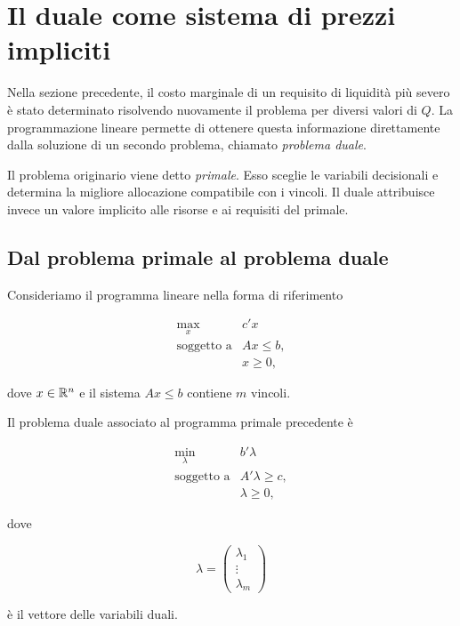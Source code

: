 \section{Il duale come sistema di prezzi impliciti}

\label{sec:cap11-duale}

Nella sezione precedente, il costo marginale di un requisito di liquidit\`{a}
pi\`{u} severo \`{e} stato determinato risolvendo nuovamente il problema per
diversi valori di \(Q\). La programmazione lineare permette di ottenere questa
informazione direttamente dalla soluzione di un secondo problema, chiamato
\emph{problema duale}.

Il problema originario viene detto \emph{primale}. Esso sceglie le variabili
decisionali e determina la migliore allocazione compatibile con i vincoli. Il
duale attribuisce invece un valore implicito alle risorse e ai requisiti del
primale.

\subsection{Dal problema primale al problema duale}

Consideriamo il programma lineare nella forma di riferimento

\[
\begin{array}{ll}
\max\limits_x
&
c'x
\\[4pt]
\mbox{soggetto a}
&
Ax\leq b,
\\[2pt]
&
x\geq0,
\end{array}
\]

\noindent dove \(x\in\mathbb{R}^n\) e il sistema \(Ax\leq b\) contiene \(m\) vincoli.

\begin{definition}

Il problema duale associato al programma primale precedente \`{e}

\[
\begin{array}{ll}
\min\limits_{\lambda}
&
b'\lambda
\\[4pt]
\mbox{soggetto a}
&
A'\lambda\geq c,
\\[2pt]
&
\lambda\geq0,
\end{array}
\]

\noindent dove

\[
\lambda
=
\begin{pmatrix}
\lambda_1\\
\vdots\\
\lambda_m
\end{pmatrix}
\]

\noindent \`{e} il vettore delle variabili duali.

\end{definition}

